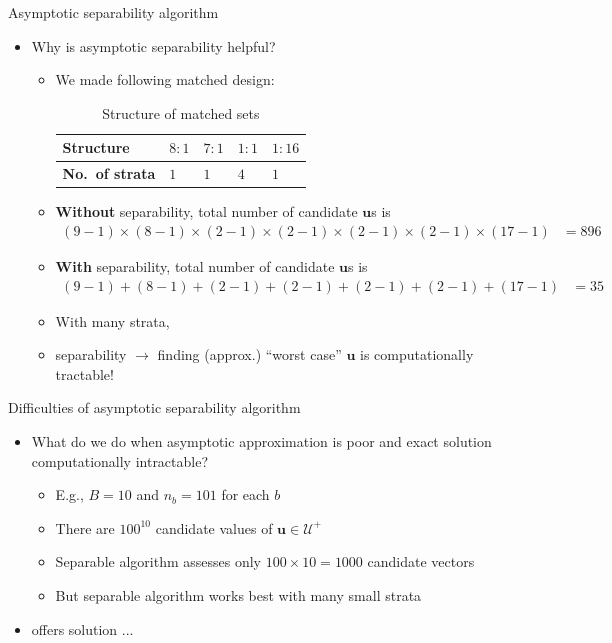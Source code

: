 \documentclass[table, xcolor={dvipsnames}, 9pt]{beamer}
\theoremstyle{newstyle}
\begin{document}
\begin{frame}{Asymptotic separability algorithm}
\vfill
\begin{itemize} \vfill
\item Why is asymptotic separability helpful? \vfill
\begin{itemize} \vfill
\item We made following matched design: \vfill
\vspace{2em}
\begin{table}[H]
\begin{tabular}{l|l|l|l|l}
\textbf{Structure} & $8:1$ & $7:1$ & $1:1$ & $1:16$ \\ \hline 
\textbf{No.~of strata} & $1$   & $1$   & $4$   & $1$ \\
\end{tabular}
\caption{Structure of matched sets}
\end{table} \vfill
\item \textbf{Without} separability, total number of candidate $\bm{u}$s is \vfill
\begin{align*}
(9 - 1) \times (8 - 1) \times (2 - 1) \times (2 - 1) \times (2 - 1) \times (2 - 1) \times (17 - 1) & = 896
\end{align*} \vfill
\item \textbf{With} separability, total number of candidate $\bm{u}$s is \vfill
\begin{align*}
(9 - 1) + (8 - 1) + (2 - 1) + (2 - 1) + (2 - 1) + (2 - 1) + (17 - 1) & = 35
\end{align*} \vfill
\item With many strata, \vfill
\item[] separability $\rightarrow$ finding (approx.) ``worst case'' $\bm{u}$ is computationally tractable! \vfill
\end{itemize} \vfill
\end{itemize} \vfill
\end{frame}
\begin{frame}{Difficulties of asymptotic separability algorithm}
\vfill
\begin{itemize} \vfill
\item What do we do when asymptotic approximation is poor and exact solution computationally intractable? \vfill
\begin{itemize} \vfill
\item E.g., $B = 10$ and $n_b = 101$ for each $b$ \vfill
\item[] There are $100^{10}$ candidate values of $\bm{u} \in \mathcal{U}^+$ \vfill
\item[] Separable algorithm assesses only $100 \times 10 = 1000$ candidate vectors \vfill
\item[] But separable algorithm works best with many small strata \vfill
\end{itemize} \vfill
\item \citet{rosenbaum2018} offers solution ...
\end{itemize} \vfill
\end{frame}
\end{document}
